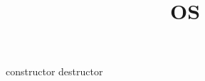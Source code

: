 \documentclass[cn,hazy,blue,screen,14pt]{template}
\title{OS}
\author{}
\date{\zhtoday}
\begin{document}
\maketitle
\newpage
\tableofcontents
\newpage

constructor destructor
\end{document}
